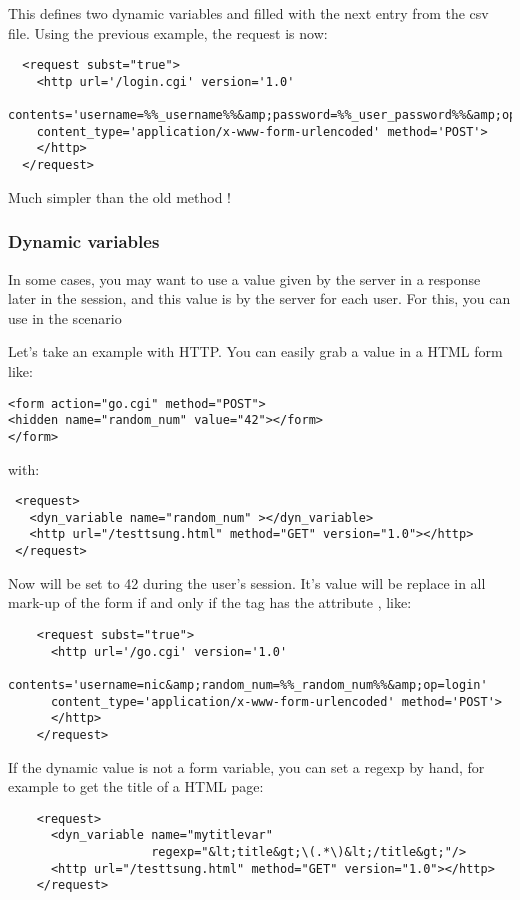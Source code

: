 \documentclass{TSUNG-en}
\begin{document}
This defines two dynamic variables  and
 filled with the next entry from the csv
file. Using the previous example, the request is now:
\begin{Verbatim}
  <request subst="true">
    <http url='/login.cgi' version='1.0'
      contents='username=%%_username%%&amp;password=%%_user_password%%&amp;op=login'
    content_type='application/x-www-form-urlencoded' method='POST'>
    </http>
  </request>
\end{Verbatim}

Much simpler than the old method !

\subsubsection{Dynamic variables}

In some cases, you may want to use a value given by the server in a
response later in the session, and this value is  by the server for each user. For this, you can use
 in the scenario

Let's take an example with HTTP. You can easily grab a value in a HTML
form like:
\begin{Verbatim}
<form action="go.cgi" method="POST">
<hidden name="random_num" value="42"></form>
</form>
\end{Verbatim}

with:
\begin{Verbatim}
 <request>
   <dyn_variable name="random_num" ></dyn_variable>
   <http url="/testtsung.html" method="GET" version="1.0"></http>
 </request>
\end{Verbatim}

Now  will be set to 42 during the user's session. It's
value will be replace in all mark-up of the form
 if and only if the  tag has the
attribute , like:

\begin{Verbatim}
    <request subst="true">
      <http url='/go.cgi' version='1.0'
      contents='username=nic&amp;random_num=%%_random_num%%&amp;op=login'
      content_type='application/x-www-form-urlencoded' method='POST'>
      </http>
    </request>
\end{Verbatim}

If the dynamic value is not a form variable, you can set a regexp by
hand, for example to get the title of a HTML page:
\begin{Verbatim}
    <request>
      <dyn_variable name="mytitlevar"
                    regexp="&lt;title&gt;\(.*\)&lt;/title&gt;"/>
      <http url="/testtsung.html" method="GET" version="1.0"></http>
    </request>
\end{Verbatim}
\end{document}
